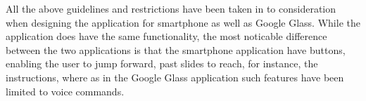 All the above guidelines and restrictions have been taken in to consideration when designing the application for smartphone as well as Google Glass. While the application does have the same functionality, the most noticable difference between the two applications is that the smartphone application have buttons, enabling the user to jump forward, past slides to reach, for instance, the instructions, where as in the Google Glass application such features have been limited to voice commands.